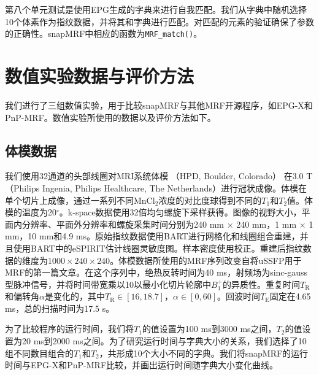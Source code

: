 第八个单元测试是使用EPG生成的字典来进行自我匹配。我们从字典中随机选择10个体素作为指纹数据，并将其和字典进行匹配。对匹配的元素的验证确保了参数的正确性。snapMRF中相应的函数为\texttt{MRF\_match()}。

\section{数值实验数据与评价方法}
我们进行了三组数值实验，用于比较snapMRF与其他MRF开源程序，如EPG-X和PnP-MRF。数值实验所使用的数据以及评价方法如下。

\subsection{体模数据}
我们使用32通道的头部线圈对MRI系统体模 \cite{keenan_comparison_2016}（HPD, Boulder, Colorado） 在3.0 T（Philips Ingenia, Philips Healthcare, The Netherlands）进行冠状成像。体模在单个切片上成像，通过一系列不同MnCl$_2$浓度的对比度球得到不同的$T_1$和$T_2$值。体模的温度为20$^{\circ}$。k-space数据使用32倍均匀螺旋下采样获得\cite{pipe_spiral_2014}。图像的视野大小，平面内分辨率、平面外分辨率和螺旋采集时间分别为240 mm $\times$ 240 mm，1 mm $\times$ 1 mm，10 mm和4.9 ms。原始指纹数据使用BART\cite{bart}进行网格化和线圈组合重建，并且使用BART中的eSPIRIT估计线圈灵敏度图。样本密度使用\cite{zwart_sdc_2012}校正。重建后指纹数据的维度为$1000 \times 240 \times 240$。体模数据所使用的MRF序列改变自将uSSFP用于MRF的第一篇文章\cite{jiang}。在这个序列中，绝热反转时间为40 ms，射频场为sinc-gauss型脉冲信号，并将时间带宽乘以10以最小化切片轮廓中$B_1^+$的异质性。重复时间$T_\mathrm{R}$和偏转角$\alpha$是变化的，其中$T_\mathrm{R}\in [16,18.7]$，$\alpha \in [0,60]$。回波时间$T_\mathrm{E}$固定在4.65 ms，总的扫描时间为17.5 s。

为了比较程序的运行时间，我们将$T_1$的值设置为100 ms到3000 ms之间，$T_2$的值设置为20 ms到2000 ms之间。为了研究运行时间与字典大小的关系，我们选择了10组不同数目组合的$T_1$和$T_2$，共形成10个大小不同的字典。我们将snapMRF的运行时间与EPG-X\cite{malik_extended_2018}和PnP-MRF\cite{cloos2016multiparametric}比较，并画出运行时间随字典大小变化曲线。

